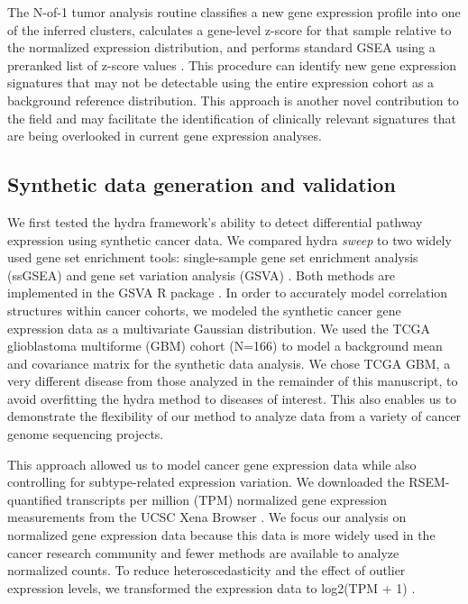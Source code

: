 \documentclass[10pt,letterpaper]{article}
\begin{document}
The N-of-1 tumor analysis routine classifies a new gene expression profile into one of the inferred clusters, calculates a gene-level z-score for that sample relative to the normalized expression distribution, and performs standard GSEA using a preranked list of z-score values \cite{korotkevichFastGeneSet2019}. This procedure can identify new gene expression signatures that may not be detectable using the entire expression cohort as a background reference distribution. This approach is another novel contribution to the field and may facilitate the identification of clinically relevant signatures that are being overlooked in current gene expression analyses.

\subsection*{Synthetic data generation and validation}
We first tested the hydra framework’s ability to detect differential pathway expression using synthetic cancer data. We compared hydra \textit{sweep} to two widely used gene set enrichment tools: single-sample gene set enrichment analysis (ssGSEA) and gene set variation analysis (GSVA) \cite{barbieSystematicRNAInterference2009, hanzelmannGSVAGeneSet2013, tarcaComparisonGeneSet2013}. Both methods are implemented in the GSVA R package \cite{hanzelmannGSVAGeneSet2013}. In order to accurately model correlation structures within cancer cohorts, we modeled the synthetic cancer gene expression data as a multivariate Gaussian distribution. We used the TCGA glioblastoma multiforme (GBM) cohort (N=166) to model a background mean and covariance matrix for the synthetic data analysis. We chose TCGA GBM, a very different disease from those analyzed in the remainder of this manuscript, to avoid overfitting the hydra method to diseases of interest. This also enables us to demonstrate the flexibility of our method to analyze data from a variety of cancer genome sequencing projects.

This approach allowed us to model cancer gene expression data while also controlling for subtype-related expression variation. We downloaded the RSEM-quantified transcripts per million (TPM) normalized gene expression measurements from the UCSC Xena Browser \cite{goldmanUCSCXenaPlatform2018}. We focus our analysis on normalized gene expression data because this data is more widely used in the cancer research community and fewer methods are available to analyze normalized counts. To reduce heteroscedasticity and the effect of outlier expression levels, we transformed the expression data to log2(TPM + 1) \cite{zwienerTransformingRNASeqData2014}.
\end{document}
